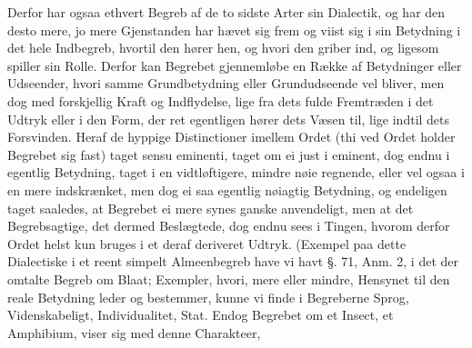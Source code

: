 \documentclass[12pt]{book}
\def\textit#1{#1}%
\def\emph#1{#1}%
\newcommand{\opage}[1]{\marginnote{\footnotesize\textit{[#1]}}}
\begin{document}
Derfor har ogsaa ethvert Begreb af de to sidste Arter sin \emph{Dialectik}, og har den
desto mere, jo mere Gjenstanden har hævet sig frem og viist sig i sin Betydning i det
hele Indbegreb, hvortil den hører hen, og hvori den griber ind, og ligesom spiller sin
Rolle. Derfor kan Begrebet gjennemløbe en Række af Betydninger eller Udseender, hvori
samme Grundbetydning eller Grundudseende vel bliver, men dog med forskjellig Kraft og
Indflydelse, lige fra dets fulde Fremtræden i det Udtryk eller i den Form, der ret
egentligen hører dets Væsen til, lige indtil dets
\opage{232} Forsvinden. Heraf de hyppige \emph{Distinctioner} imellem Ordet (thi ved Ordet holder
Begrebet sig fast) taget \textit{sensu eminenti}, taget om ei just i eminent, dog endnu
i egentlig Betydning, taget i en vidtløftigere, mindre nøie regnende, eller vel ogsaa i
en mere indskrænket, men dog ei saa egentlig nøiagtig Betydning, og endeligen taget
saaledes, at Begrebet ei mere synes ganske anvendeligt, men at det Begrebsagtige, det
dermed Beslægtede, dog endnu sees i Tingen, hvorom derfor Ordet helst kun bruges i et
deraf deriveret Udtryk. (Exempel paa dette Dialectiske i et reent simpelt Almeenbegreb
have vi havt §. 71, Anm. 2, i det der omtalte Begreb om Blaat; Exempler, hvori, mere
eller mindre, Hensynet til den reale Betydning leder og bestemmer, kunne vi finde i
Begreberne \emph{Sprog}, \emph{Videnskabeligt}, \emph{Individualitet}, \emph{Stat}.
Endog Begrebet om et \emph{Insect}, et \emph{Amphibium}, viser sig med denne Charakteer,
\end{document}
